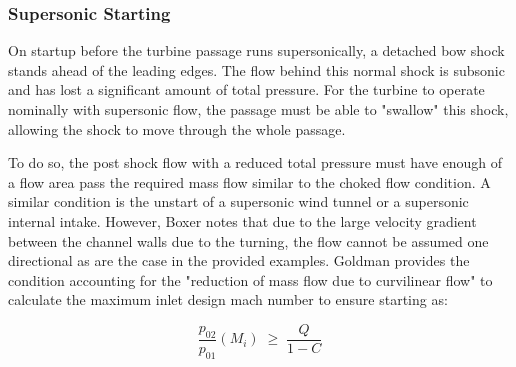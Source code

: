 




\subsubsection{Supersonic Starting}
\label{subsec:supersonic_starting}

On startup before the turbine passage runs supersonically, a detached bow shock stands ahead of the leading edges. The flow behind this normal shock is subsonic and has lost a significant amount of total pressure. For the turbine to operate nominally with supersonic flow, the passage must be able to "swallow" this shock, allowing the shock to move through the whole passage.

To do so, the post shock flow with a reduced total pressure must have enough of a flow area pass the required mass flow similar to the choked flow condition. A similar condition is the unstart of a supersonic wind tunnel or a supersonic internal intake. However, Boxer notes that due to the large velocity gradient between the channel walls due to the turning, the flow cannot be assumed one directional as are the case in the provided examples. Goldman provides the condition \cite{goldmanAnalyticalInvestigationSupersonic1968} accounting for the "reduction of mass flow due to curvilinear flow" to calculate the maximum inlet design mach number to ensure starting as:

\begin{equation}
\frac{p_{02}}{p_{01}}(M_i) \;\geq\; \frac{Q}{1-C}
\label{eq:goldman_starting}
\end{equation}


